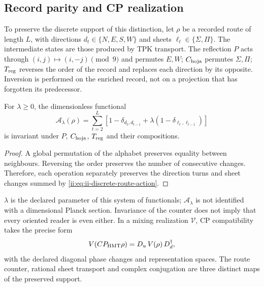 \subsection{Record parity and CP realization}

To preserve the discrete support of this distinction, let \(\rho\) be a recorded route of length \(L\), with directions \(d_t\in\{N,E,S,W\}\) and sheets \(\ell_t\in\{\Sigma,\Pi\}\). The intermediate states are those produced by TPK transport. The reflection \(P\) acts through \((i,j)\mapsto(i,-j)\pmod9\) and permutes \(E,W\); \(C_{\rm hoja}\) permutes \(\Sigma,\Pi\); \(T_{\rm reg}\) reverses the order of the record and replaces each direction by its opposite. Inversion is performed on the enriched record, not on a projection that has forgotten its predecessor.

\begin{proposition}
For \(\lambda\ge0\), the dimensionless functional
\begin{equation}
 \mathcal A_\lambda(\rho)=
 \sum_{t=2}^{L}\left[1-\delta_{d_t,d_{t-1}}
             +\lambda(1-\delta_{\ell_t,\ell_{t-1}})\right]
 \label{ii:eq:ii-discrete-route-action}
\end{equation}
is invariant under \(P\), \(C_{\rm hoja}\), \(T_{\rm reg}\) and their compositions.
\end{proposition}

\begin{proof}
A global permutation of the alphabet preserves equality between neighbours. Reversing the order preserves the number of consecutive changes. Therefore, each operation separately preserves the direction turns and sheet changes summed by \eqref{ii:eq:ii-discrete-route-action}.
\end{proof}

\(\lambda\) is the declared parameter of this system of functionals; \(\mathcal A_\lambda\) is not identified with a dimensional Planck section. Invariance of the counter does not imply that every oriented reader is even either. In a mixing realization \(\mathcal V\), CP compatibility takes the precise form
\begin{equation}
 \mathcal V(CP_{\rm HMT}\rho)
 =D_u\,\overline{\mathcal V(\rho)}\,D_d^\dagger,
 \label{ii:eq:ii-cp-square}
\end{equation}
with the declared diagonal phase changes and representation spaces. The route counter, rational sheet transport and complex conjugation are three distinct maps of the preserved support.

